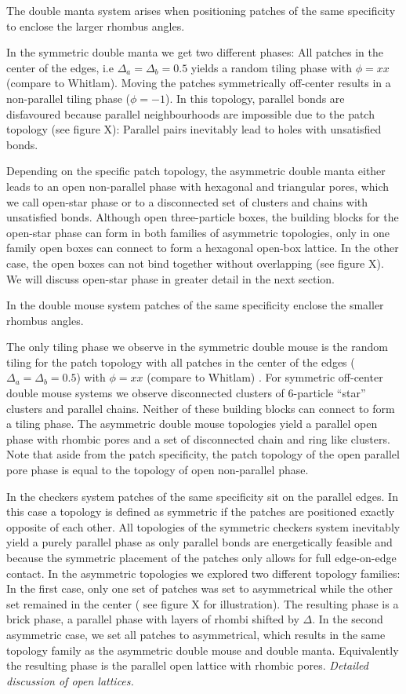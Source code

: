 \documentclass[a4paper,preprint]{revtex4}
\begin{document}
The double manta system arises when positioning patches of the same specificity to enclose the larger rhombus angles. 

In the symmetric double manta we get two different phases:  All patches in the center of the edges, i.e $\Delta_{a} = \Delta_{b} = 0.5 $ yields a 
random tiling phase with $\phi = xx$ (compare to Whitlam).
Moving the patches symmetrically off-center results in a non-parallel tiling phase ($\phi=-1$).  In this topology, parallel bonds are disfavoured because parallel neighbourhoods are impossible due to the patch topology (see figure X): Parallel pairs inevitably lead to holes with unsatisfied bonds.

Depending on the specific patch topology, the asymmetric double manta either leads to an open non-parallel phase with hexagonal and triangular pores, which we call open-star phase or to a disconnected set of clusters and chains with unsatisfied bonds.
Although open three-particle boxes, the building blocks for the open-star phase can form in both families of asymmetric topologies, only in 
one family open boxes can connect to form a hexagonal open-box lattice. In the other case, the open boxes can not bind together without overlapping (see figure X).
We will discuss open-star phase in greater detail in the next section.

In the double mouse system patches of the same specificity enclose the smaller rhombus angles. 

The only tiling phase we observe in the symmetric double mouse is the random tiling for the patch topology with all patches in the center of the edges ($\Delta_{a} = \Delta_{b} = 0.5 $) with $\phi = xx$ (compare to Whitlam) .
For symmetric off-center double mouse systems we observe disconnected clusters of 6-particle “star” clusters and parallel chains. Neither of these  building blocks can connect to form a tiling phase. 
 The asymmetric double mouse topologies yield a parallel open phase with rhombic pores and a set of disconnected chain and ring like clusters. 
Note that aside from the patch specificity, the patch topology of the open parallel pore phase is equal to the topology of open non-parallel phase. 

In the checkers system patches of the same specificity sit on the parallel edges.
In this case a topology is defined as symmetric if the patches are positioned exactly opposite of each other. 
All topologies of the symmetric checkers system inevitably yield a purely parallel phase as only parallel bonds are energetically feasible and because the symmetric placement of the patches only allows for full edge-on-edge contact.
In the asymmetric topologies we explored two different topology families:
In the first case, only one set of patches was set to asymmetrical while the other set remained in the center ( see figure X for illustration). The resulting phase is a brick phase, a parallel phase with layers of rhombi shifted by $\Delta$. 
In the second asymmetric case, we set all patches to asymmetrical, which results in the same topology family as the asymmetric double mouse and double manta. Equivalently the resulting phase is the parallel open lattice with rhombic pores. 
\newline
\textit{Detailed discussion of open lattices.}
\end{document}
